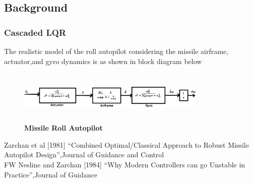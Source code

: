 \documentclass[10pt]{beamer}
\begin{document}
\subsection{Background}
\begin{frame}
\frametitle{Cascaded LQR}
The realistic model of the roll autopilot considering the missile airframe, actuator,and gyro dynamics is as shown in block diagram below
\begin{figure}[h]
\begin{center}
\includegraphics[width=9.0cm,height=2.5cm]{BlockDiaLQRs14.eps}
\vspace{-0.2cm}
\caption{\bf{Missile Roll Autopilot \cite{zarchannesline81}\cite{zarchannesline1984}}} \label{Cascade14}
\end{center}
\vspace{-0.5cm}
\end{figure}
\vspace{.5cm}
\footnoterule
\tiny {\cite{zarchannesline81} Zarchan et al [1981] ``Combined Optimal/Classical Approach to Robust Missile Autopilot Design'',Journal of Guidance and Control} \\
\tiny {\cite{zarchannesline1984} FW Nesline and Zarchan [1984] ``Why Modern Controllers can go Unstable in Practice'',Journal of Guidance} \\

\vspace{.4cm}
\end{frame}
\end{document}
